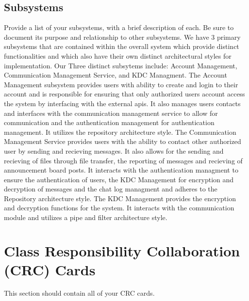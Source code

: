 \documentclass[]{article}
\begin{document}
\subsection{Subsystems}
\label{sub:subsystems}
Provide a list of your subsystems, with a brief description of each. Be sure to document its purpose and relationship to other subsystems.
\newline
\newline
We have 3 primary subsystems that are contained within the overall system which provide distinct functionalities and which also have their own distinct architectural styles for implementation. Our Three distinct subsytems include: Account Management, Communication Management Service, and KDC Managment.
\newline
\newline
The Account Management subsystem provides users with ability to create and login to their account and is responsible for ensuring that only authorized users account access the system by interfacing with the external apis. It also manages users contacts and interfaces with the communication management service to allow for communication and the authentication management for authentication management. It utilizes the repository architecture style.
\newline
\newline
The Communication Management Service provides users with the ability to contact other authorized user by sending and recieving messages. It also allows for the sending and recieving of files through file transfer, the reporting of messages and recieving of announcement board posts. It interacts with the authentication managment to ensure the authentication of users, the KDC Management for encryption and decryption of messages and the chat log managment and adheres to the Repository architecture style.
\newline
\newline
The KDC Management provides the encryption and decryption functions for the system. It interacts with the communication module and utilizes a pipe and filter architecture style.


\section{Class Responsibility Collaboration (CRC) Cards}
\label{sec:class_responsibility_collaboration_crc_cards}
This section should contain all of your CRC cards.
\end{document}
